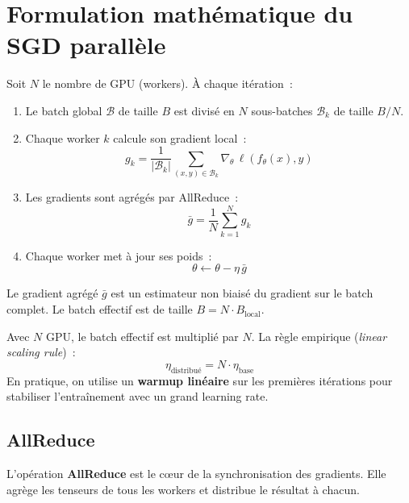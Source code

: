\section{Formulation math\'ematique du SGD parall\`ele}
\label{sec:math-parallel-sgd}

Soit $N$ le nombre de GPU (workers). \`A chaque it\'eration~:

\begin{formules}[title=\textbf{SGD avec parall\'elisme de donn\'ees}]
\begin{enumerate}
  \item Le batch global $\mathcal{B}$ de taille $B$ est divis\'e en
    $N$ sous-batches $\mathcal{B}_k$ de taille $B/N$.
  \item Chaque worker $k$ calcule son gradient local~:
    \[
      g_k = \frac{1}{|\mathcal{B}_k|} \sum_{(x,y) \in \mathcal{B}_k}
      \nabla_\theta \, \ell(f_\theta(x), y)
    \]
  \item Les gradients sont agr\'eg\'es par AllReduce~:
    \[
      \bar{g} = \frac{1}{N} \sum_{k=1}^{N} g_k
    \]
  \item Chaque worker met \`a jour ses poids~:
    \[
      \theta \leftarrow \theta - \eta \, \bar{g}
    \]
\end{enumerate}
Le gradient agr\'eg\'e $\bar{g}$ est un estimateur non biais\'e du gradient
sur le batch complet. Le batch effectif est de taille $B = N \cdot B_{\text{local}}$.
\end{formules}

\begin{attention}[title=\textbf{Scaling du learning rate}]
Avec $N$ GPU, le batch effectif est multipli\'e par $N$. La r\`egle
empirique (\emph{linear scaling rule})~:
\[
  \eta_{\text{distribu\'e}} = N \cdot \eta_{\text{base}}
\]
En pratique, on utilise un \textbf{warmup lin\'eaire} sur les premi\`eres
it\'erations pour stabiliser l'entra\^inement avec un grand learning rate.
\end{attention}

\subsection{AllReduce}

L'op\'eration \textbf{AllReduce} est le c\oe ur de la synchronisation
des gradients. Elle agr\`ege les tenseurs de tous les workers et distribue
le r\'esultat \`a chacun.

